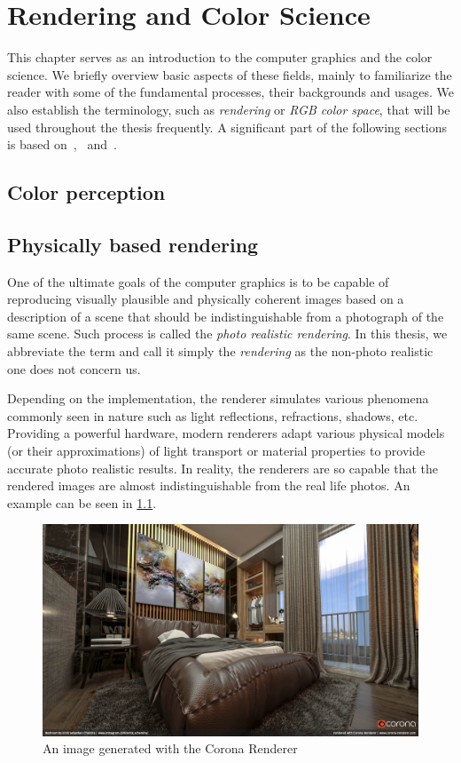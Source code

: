 \chapter{Rendering and Color Science}

This chapter serves as an introduction to the computer graphics and the color science. We briefly overview basic aspects of these fields, mainly to familiarize the reader with some of the fundamental processes, their backgrounds and usages. We also establish the terminology, such as \emph{rendering} or \emph{RGB color space}, that will be used throughout the thesis frequently. A significant part of the following sections is based on~\citet{wyszecki1982color},~\citet{nimier2019mitsuba} and~\citet{pharr2016physically}.

\section{Color perception}



\section{Physically based rendering}

One of the ultimate goals of the computer graphics is to be capable of reproducing visually plausible and physically coherent images based on a description of a scene that should be indistinguishable from a photograph of the same scene. Such process is called the \emph{photo realistic rendering}. In this thesis, we abbreviate the term and call it simply the \emph{rendering} as the non-photo realistic one does not concern us.

Depending on the implementation, the renderer simulates various phenomena commonly seen in nature such as light reflections, refractions, shadows, etc. Providing a powerful hardware, modern renderers adapt various physical models (or their approximations) of light transport or material properties to provide accurate photo realistic results. In reality, the renderers are so capable that the rendered images are almost indistinguishable from the real life photos. An example can be seen in \ref{fig:corona_render}.

\begin{figure}[H]
	\centering
	\includegraphics[width=\linewidth]{img/corona_render.jpg}
	\caption{An image generated with the Corona Renderer}
	\label{fig:corona_render}
\end{figure}

